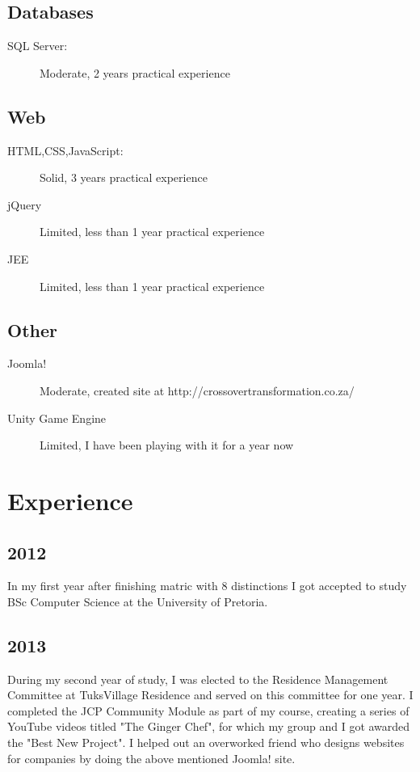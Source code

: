 \documentclass[a4paper]{article}
\begin{document}
	\subsection*{Databases}
		\begin{description}
			\item[SQL Server:]Moderate, 2 years practical experience
		\end{description}
	\subsection*{Web}
		\begin{description}
			\item[HTML,CSS,JavaScript:]Solid, 3 years practical experience
			\item[jQuery]Limited, less than 1 year practical experience
			\item[JEE]Limited, less than 1 year practical experience
		\end{description}
	\subsection*{Other}
		\begin{description}
			\item[Joomla!]Moderate, created site at http://crossovertransformation.co.za/
            \item[Unity Game Engine]Limited, I have been playing with it for a year now
		\end{description}

\section*{Experience}

	\subsection*{2012}
		In my first year after finishing matric with 8 distinctions I got accepted to study BSc Computer Science at the University of Pretoria. 
	\subsection*{2013}
		During my second year of study, I was elected to the Residence Management Committee at TuksVillage Residence and served on this committee for one year. I completed the JCP Community Module as part of my course, creating a series of YouTube videos titled "The Ginger Chef", for which my group and I got awarded the "Best New Project". I helped out an overworked friend who designs websites for companies by doing the above mentioned Joomla! site.
\end{document}
